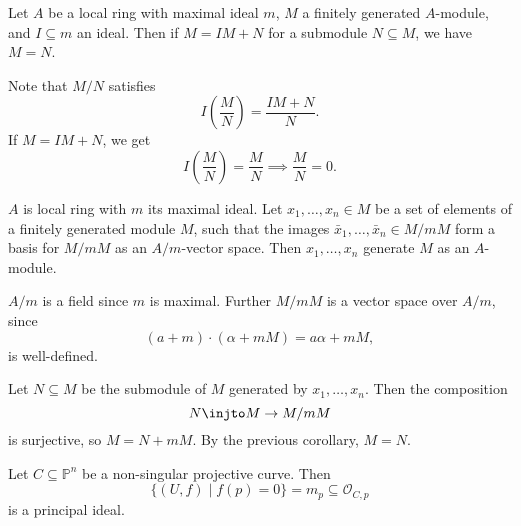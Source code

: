 \documentclass[12pt]{article}
\begin{document}
\begin{corollary}
	Let $A$ be a local ring with maximal ideal $m$, $M$ a finitely generated $A$-module, and $I \subseteq m$ an ideal. Then if $M = IM + N$ for a submodule $N \subseteq M$, we have $M = N$.
\end{corollary}

\begin{proofbox}
	Note that $M/N$ satisfies
	\[
	I \left( \frac{M}{N} \right)= \frac{IM + N}{N}.
	\]
	If $M = IM + N$, we get
	\[
	I \left(\frac{M}{N} \right) = \frac{M}{N} \implies \frac{M}{N} = 0.
	\]
\end{proofbox}

\begin{corollary}
	$A$ is local ring with $m$ its maximal ideal. Let $x_1, \ldots, x_n \in M$ be a set of elements of a finitely generated module $M$, such that the images $\bar x_1 ,\ldots, \bar x_n \in M/mM$ form a basis for $M/mM$ as an $A/m$-vector space. Then $x_1, \ldots, x_n$ generate $M$ as an $A$-module.
\end{corollary}

\begin{remark}
	$A/m$ is a field since $m$ is maximal. Further $M/mM$ is a vector space over $A/m$, since
	\[
		(a + m) \cdot (\alpha + m M) = a \alpha + m M,
	\]
	is well-defined.
\end{remark}

\begin{proofbox}
	Let $N \subseteq M$ be the submodule of $M$ generated by $x_1, \ldots, x_n$. Then the composition
	\[
	N \injto M \to M/mM
	\]
	is surjective, so $M = N + mM$. By the previous corollary, $M = N$.
\end{proofbox}


\begin{corollary}
	Let $C \subseteq \mathbb{P}^n$ be a non-singular projective curve. Then
	\[
		\{(U, f) \mid f(p) = 0\} = m_p \subseteq \mathcal{O}_{C, p}
	\]
	is a principal ideal.
\end{corollary}
\end{document}
